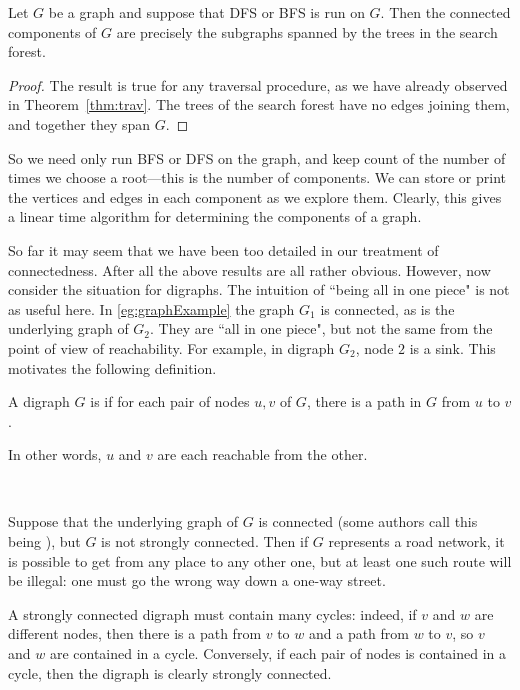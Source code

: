 \begin{Theorem}
\label{thm:trav-comps}
Let $G$ be a graph and suppose that DFS or BFS is run on $G$. Then the
connected components of $G$ are precisely the subgraphs spanned by the
trees in the search forest. 
\end{Theorem}

\begin{proof}
The result is true for any traversal procedure, as we have already observed in 
Theorem~\ref{thm:trav}. The trees of the search forest have no edges joining 
them, and together they span $G$.
\end{proof}

So we need only run BFS or DFS on the graph, and keep count
of the number of times we choose a root---this is the number of
components. We can store or print the vertices and edges in each
component as we explore them. Clearly, this gives a linear time algorithm
for determining the components of a graph.

So far it may seem that we have been too detailed in our treatment of 
connectedness. After all the above results are all rather obvious.
However, now consider the situation for digraphs. The intuition of ``being all 
in one piece" is not as useful here. In
\cref{eg:graphExample} the graph $G_1$ is connected, as is the
underlying graph of $G_2$. They are ``all in one piece", but not the
same from the point of view of reachability. For example, in digraph
$G_2$, node $2$ is a sink. This motivates the following definition.

\begin{Definition}
A digraph $G$ is  if for each pair of nodes $u, v$ 
of $G$, there is a path in $G$ from $u$ to $v$.
\end{Definition}

\begin{note}
In other words, $u$ and $v$ are each reachable from the other.

\

Suppose that the underlying graph of $G$ is connected (some authors call
this being ), but $G$ is not strongly
connected. Then if $G$ represents a road network, it is possible to get
from any place to any other one, but at least one such route will be
illegal: one must go the wrong way down a one-way street. 
\end{note}

A strongly connected digraph must contain many cycles: indeed, if $v$ and
$w$ are different nodes, then there is a path from $v$ to $w$ and a path
from $w$ to $v$, so $v$ and $w$ are contained in a cycle. Conversely, if
each pair of nodes is contained in a cycle, then the digraph is clearly
strongly connected.

